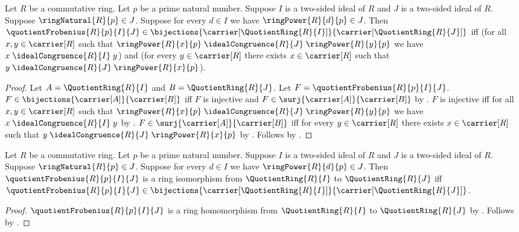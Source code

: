\begin{theorem}\label{quotient_frobenius_bijective_iff}
    Let $R$ be a commutative ring.
    Let $p$ be a prime natural number.
    Suppose $I$ is a two-sided ideal of $R$ and
        $J$ is a two-sided ideal of $R$.
    Suppose $\ringNatural{R}{p}\in J$.
    Suppose for every $d\in I$ we have
        $\ringPower{R}{d}{p}\in J$.
    Then $\quotientFrobenius{R}{p}{I}{J}\in
        \bijections{\carrier[\QuotientRing{R}{I}]}{
            \carrier[\QuotientRing{R}{J}]}$ iff
        (for all $x,y\in\carrier[R]$ such that
            $\ringPower{R}{x}{p}
                \mathrel{\idealCongruence{R}{J}}
            \ringPower{R}{y}{p}$ we have
                $x\mathrel{\idealCongruence{R}{I}}y$) and
        (for every $y\in\carrier[R]$ there exists $x\in\carrier[R]$
            such that
            $y\mathrel{\idealCongruence{R}{J}}
                \ringPower{R}{x}{p}$).
\end{theorem}
\begin{proof}
    Let $A=\QuotientRing{R}{I}$ and $B=\QuotientRing{R}{J}$.
    Let $F=\quotientFrobenius{R}{p}{I}{J}$.
    $F\in\bijections{\carrier[A]}{\carrier[B]}$ iff
        $F$ is injective and
        $F\in\surj{\carrier[A]}{\carrier[B]}$ by
        .
    $F$ is injective iff
        for all $x,y\in\carrier[R]$ such that
            $\ringPower{R}{x}{p}
                \mathrel{\idealCongruence{R}{J}}
            \ringPower{R}{y}{p}$ we have
                $x\mathrel{\idealCongruence{R}{I}}y$ by
        .
    $F\in\surj{\carrier[A]}{\carrier[B]}$ iff
        for every $y\in\carrier[R]$ there exists $x\in\carrier[R]$
            such that
            $y\mathrel{\idealCongruence{R}{J}}
                \ringPower{R}{x}{p}$ by
        .
    Follows by \auto.
\end{proof}

\begin{theorem}\label{quotient_frobenius_isomorphism_iff_bijective}
    Let $R$ be a commutative ring.
    Let $p$ be a prime natural number.
    Suppose $I$ is a two-sided ideal of $R$ and
        $J$ is a two-sided ideal of $R$.
    Suppose $\ringNatural{R}{p}\in J$.
    Suppose for every $d\in I$ we have
        $\ringPower{R}{d}{p}\in J$.
    Then $\quotientFrobenius{R}{p}{I}{J}$ is a ring isomorphism from
        $\QuotientRing{R}{I}$ to $\QuotientRing{R}{J}$ iff
        $\quotientFrobenius{R}{p}{I}{J}\in
            \bijections{\carrier[\QuotientRing{R}{I}]}{
                \carrier[\QuotientRing{R}{J}]}$.
\end{theorem}
\begin{proof}
    $\quotientFrobenius{R}{p}{I}{J}$ is a ring homomorphism from
        $\QuotientRing{R}{I}$ to $\QuotientRing{R}{J}$ by
        .
    Follows by .
\end{proof}


